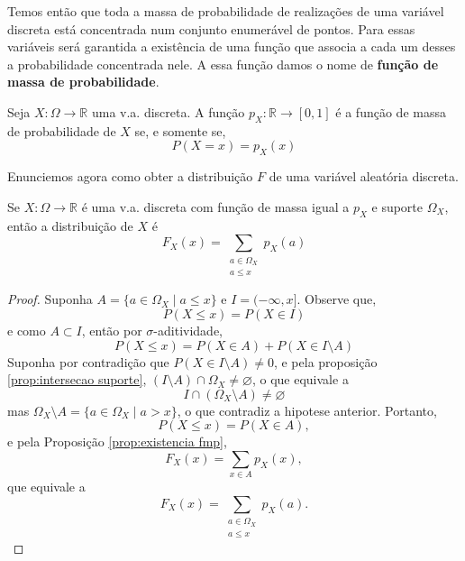 Temos então que toda a massa de probabilidade de realizações de uma variável discreta está
concentrada num conjunto enumerável de pontos.
Para essas variáveis será garantida a existência de uma função que associa a cada um desses
a probabilidade concentrada nele.
A essa função damos o nome de \textbf{função de massa de probabilidade}.

\begin{def:fmp}
Seja $X: \Omega \to \mathbb{R}$ uma v.a. discreta. A função $p_X: \mathbb{R} \to [0, 1]$
é a função de massa de probabilidade de $X$ se, e somente se,
\[
	P(X = x) = p_X(x)
\]
\end{def:fmp}

Enunciemos agora como obter a distribuição $F$ de uma variável aleatória discreta.

\begin{prop:fda discreto}
Se $X: \Omega \to \mathbb{R}$ é uma v.a. discreta com função de massa igual a $p_X$ e
suporte $\Omega_X$, então a distribuição de $X$ é
\[
	F_X(x) = \sum_{\substack{a \in \Omega_X \\ a \leq x}} p_X(a)
\]
\begin{proof}
	Suponha $A = \{a \in \Omega_X \mid a \le x\}$ e $I = (-\infty, x]$.
	Observe que,
	\[
		P(X \le x) = P(X \in I)
	\]
	e como $A \subset I$, então por $\sigma$-aditividade,
	\[
		P(X \le x) = P(X \in A) + P(X \in I \setminus A)
	\]
	Suponha por contradição que $P(X \in I \setminus A) \ne 0$, e pela proposição
	\ref{prop:intersecao suporte}, $(I \setminus A) \cap \Omega_X \ne \varnothing$,
	o que equivale a
	\[
		I \cap (\Omega_X \setminus A) \ne \varnothing
	\]
	mas $\Omega_X \setminus A = \{a \in \Omega_X \mid a > x\}$, o que contradiz
	a hipotese anterior.
	Portanto,
	\[
		P(X \le x) = P(X \in A),
	\]
	e pela Proposição \ref{prop:existencia fmp},
	\[
		F_X(x) = \sum_{x \in A} p_X(x),
	\]
	que equivale a
	\[
		F_X(x) = \sum_{\substack{a \in \Omega_X \\ a \leq x}} p_X(a).
	\]
\end{proof}
\end{prop:fda discreto}

